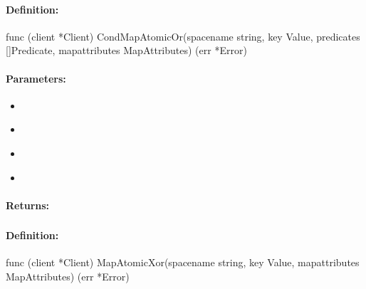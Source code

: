 \paragraph{Definition:}
\begin{gocode}
func (client *Client) CondMapAtomicOr(spacename string, key Value, predicates []Predicate, mapattributes MapAttributes) (err *Error)
\end{gocode}

\paragraph{Parameters:}
\begin{itemize}[noitemsep]
\item {}\\

\item {}\\

\item {}\\

\item {}\\

\end{itemize}

\paragraph{Returns:}


\pagebreak
\subsubsection{}
\label{api:Go:MapAtomicXor}


\paragraph{Definition:}
\begin{gocode}
func (client *Client) MapAtomicXor(spacename string, key Value, mapattributes MapAttributes) (err *Error)
\end{gocode}

